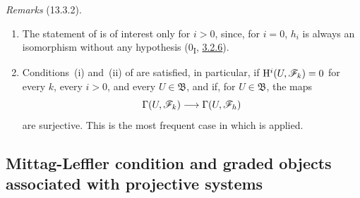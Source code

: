\begin{env}[13.3.2]
\label{0.13.3.2}
\emph{Remarks} (13.3.2).
\begin{enumerate}
  \item[{\rm(i)}]
  The statement of  is of interest only for $i>0$,
  since, for $i=0$, $h_i$ is always an isomorphism without any
  hypothesis (0\textsubscript{I}, \hyperref[0.3.2.6]{3.2.6}).

  \item[{\rm(ii)}]
  Conditions~{\rm(i)} and~{\rm(ii)} of  are satisfied,
  in particular, if
  $\mathrm{H}^i(U,\mathscr{F}_k)=0$ for every $k$, every $i>0$, and every
  $U\in\mathfrak{B}$, and if, for $U\in\mathfrak{B}$, the maps
  \[
    \Gamma(U,\mathscr{F}_k)\longrightarrow\Gamma(U,\mathscr{F}_h)
  \]
  are surjective. This is the most frequent case in which
   is applied.
\end{enumerate}
\end{env}

\subsection{Mittag-Leffler condition and graded objects associated with projective systems}
\label{subsection:0.13.4}
\label{0.13.4}

